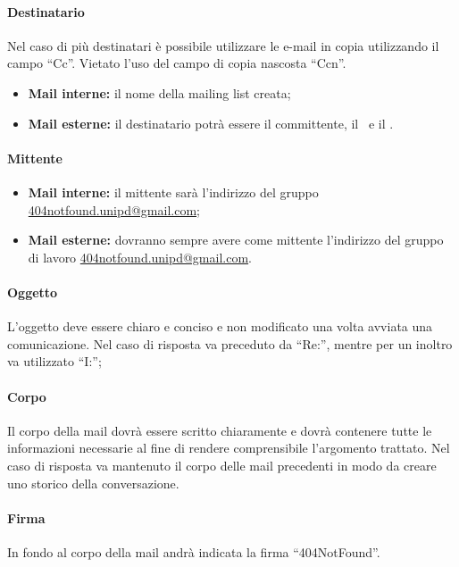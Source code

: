 \paragraph{Destinatario}
Nel caso di più destinatari è possibile utilizzare le e-mail in copia utilizzando il campo ``Cc''. Vietato l'uso del campo di copia nascosta ``Ccn''.
\begin{itemize}
	\item \textbf{Mail interne:} il nome della mailing list creata;
	\item \textbf{Mail esterne:} il destinatario potrà essere il committente, il \Vardanega\ e il \Cardin.
\end{itemize}

\paragraph{Mittente}
\begin{itemize}
	\item \textbf{Mail interne:} il mittente sarà l'indirizzo del gruppo \href{mailto:404notfound.unipd@gmail.com}{404notfound.unipd@gmail.com};
	\item \textbf{Mail esterne:} dovranno sempre avere come mittente l'indirizzo del gruppo di lavoro \href{mailto:404notfound.unipd@gmail.com}{404notfound.unipd@gmail.com}.
\end{itemize}

\paragraph{Oggetto}
L’oggetto deve essere chiaro e conciso e non modificato una volta avviata una comunicazione.
Nel caso di risposta va preceduto da ``Re:'', mentre per un inoltro va utilizzato ``I:'';

\paragraph{Corpo}
Il corpo della mail dovrà essere scritto chiaramente e dovrà contenere tutte le informazioni necessarie al fine di rendere comprensibile l'argomento trattato.
Nel caso di risposta va mantenuto il corpo delle mail precedenti in modo da creare uno storico della conversazione.

\paragraph{Firma}
In fondo al corpo della mail andrà indicata la firma ``404NotFound''.

